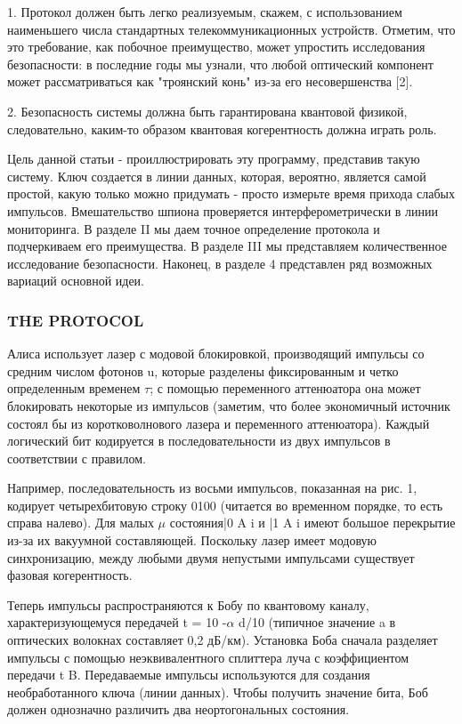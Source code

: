 1. Протокол должен быть легко реализуемым, скажем, с использованием наименьшего числа стандартных телекоммуникационных устройств. Отметим, что это требование, как побочное преимущество, может упростить исследования безопасности: в последние годы мы узнали, что любой оптический компонент может рассматриваться как "троянский конь" из-за его несовершенства [2].

2. Безопасность системы должна быть гарантирована квантовой физикой, следовательно, каким-то образом квантовая когерентность должна играть роль.

Цель данной статьи - проиллюстрировать эту программу, представив такую систему. Ключ создается в линии данных, которая, вероятно, является самой простой, какую только можно придумать - просто измерьте время прихода слабых импульсов. Вмешательство шпиона проверяется интерферометрически в линии мониторинга. В разделе II мы даем точное определение протокола и подчеркиваем его преимущества. В разделе III мы представляем количественное исследование безопасности. Наконец, в разделе 4 представлен ряд возможных вариаций основной идеи.


\subsubsection{THE PROTOCOL}

Алиса использует лазер с модовой блокировкой, производящий импульсы со средним числом фотонов u, которые разделены фиксированным и четко определенным временем $\tau$; с помощью переменного аттенюатора она может блокировать некоторые из импульсов (заметим, что более экономичный источник состоял бы из коротковолнового лазера и переменного аттенюатора). Каждый логический бит кодируется в последовательности из двух импульсов в соответствии с правилом.

Например, последовательность из восьми импульсов, показанная на рис. 1, кодирует четырехбитовую строку 0100 (читается во временном порядке, то есть справа налево). Для малых $\mu$ состояния|0 A i и |1 A i имеют большое перекрытие из-за их вакуумной составляющей. Поскольку лазер имеет модовую синхронизацию, между любыми двумя непустыми импульсами существует фазовая когерентность.

Теперь импульсы распространяются к Бобу по квантовому каналу, характеризующемуся передачей t = 10 -$\alpha$ d/10 (типичное значение a в оптических волокнах составляет 0,2 дБ/км).
Установка Боба сначала разделяет импульсы с помощью неэквивалентного сплиттера луча с коэффициентом передачи t B. Передаваемые импульсы используются для создания необработанного ключа (линии данных). Чтобы получить значение бита, Боб должен однозначно различить два неортогональных состояния.

